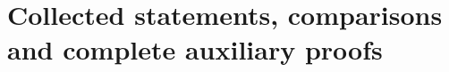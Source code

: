 \appendix
\renewcommand{\thesection}{A.\arabic{section}}
\renewcommand{\theHsection}{appendix.\arabic{section}}
\part{Collected statements, comparisons and complete auxiliary proofs}










